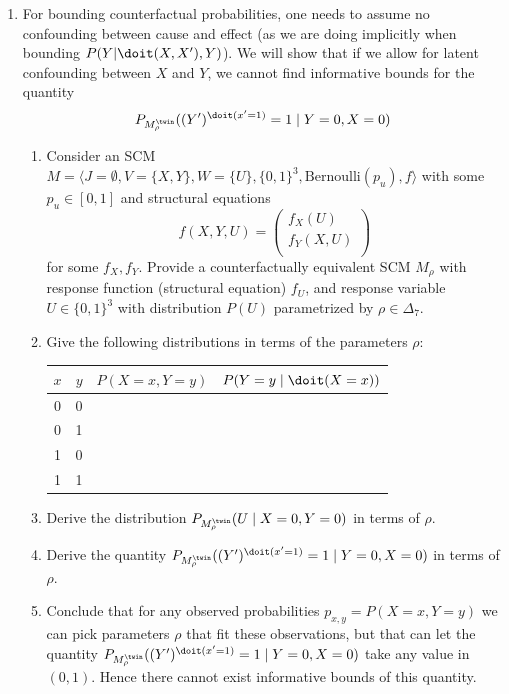 \begin{enumerate}
	\item 
	For bounding counterfactual probabilities, one needs to assume no confounding between cause and effect (as we are doing implicitly when bounding $P(Y | \doit(X, X'), Y)$).
	We will show that if we allow for latent confounding between $X$ and $Y$, we cannot find informative bounds for the quantity
	$$P_{M_{\rho}^{\twin}}((Y')^{\doit(x'=1)}=1\mid Y=0,X=0)$$
	\begin{enumerate}
		\item Consider an SCM $M=\langle J=\emptyset, V = \{X, Y\}, W=\{U\}, \{0,1\}^3, \textrm{Bernoulli}(p_u), f\rangle$ with some $p_u \in [0,1]$ and structural equations
		$$f(X, Y, U) = \begin{pmatrix}
				f_X(U)   \\
				f_Y(X,U) \\
			\end{pmatrix}$$ for some $f_X, f_Y$. Provide a counterfactually equivalent SCM $M_\rho$ with response function (structural equation) $f_U$, and response variable $U \in \{0,1\}^3$ with distribution $P(U)$ parametrized by $\rho \in \Delta_7$.
		\item Give the following distributions in terms of the parameters $\rho$:
		\begin{center}\begin{tabular}{ccll}
				$x$ & $y$ & $P(X=x, Y=y)$ & $P(Y=y\mid \doit(X=x))$ \\
				\hline
				0   & 0   &               &                         \\
				0   & 1   &               &                         \\
				1   & 0   &               &                         \\
				1   & 1   &               &
			\end{tabular}\end{center}
		\item Derive the distribution $P_{M_{\rho}^{\twin}}(U \mid X=0,Y=0)$ in terms of $\rho$.
		\item Derive the quantity $P_{M_{\rho}^{\twin}}((Y')^{\doit(x'=1)}=1\mid Y=0,X=0)$ in terms of $\rho$.
		\item Conclude that for any observed probabilities $p_{x,y} = P(X=x, Y=y)$ we can pick parameters $\rho$ that fit these observations, but that can let the quantity $P_{M_{\rho}^{\twin}}((Y')^{\doit(x'=1)}=1\mid Y=0,X=0)$ take any value in $(0,1)$. Hence there cannot exist informative bounds of this quantity.
	\end{enumerate}


\end{enumerate}

